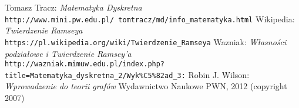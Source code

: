 \documentclass[11pt,a4paper]{article}
\theoremstyle{definition}
\theoremstyle{remark}
\begin{document}
\medskip

\begin{thebibliography}{9}

Tomasz Tracz: \textit{Matematyka Dyskretna}
\\\texttt{http://www.mini.pw.edu.pl/~tomtracz/md/info\_matematyka.html}
Wikipedia: \textit{Twierdzenie Ramseya}
\\\texttt{https://pl.wikipedia.org/wiki/Twierdzenie\_Ramseya}
Wazniak: \textit{Własności podziałowe i Twierdzenie Ramsey'a}
\\\texttt{http://wazniak.mimuw.edu.pl/index.php?title=Matematyka\_dyskretna\_2/Wyk\%C5\%82ad\_3:}
Robin J. Wilson: \textit{Wprowadzenie do teorii grafów}
Wydawnictwo Naukowe PWN, 2012 (copyright 2007)
\end{thebibliography}
\end{document}
